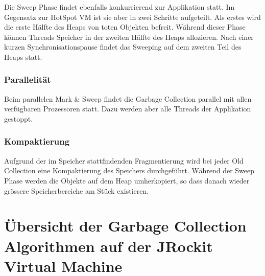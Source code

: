 Die Sweep Phase findet ebenfalls konkurrierend zur Applikation statt. Im Gegensatz zur HotSpot VM ist sie aber in zwei Schritte aufgeteilt. Als erstes wird die erste Hälfte des Heaps von toten Objekten befreit. Während dieser Phase können Threads Speicher in der zweiten Hälfte des Heaps allozieren. Nach einer kurzen Synchronisationspause findet das Sweeping auf dem zweiten Teil des Heaps statt.

\subsubsection{Parallelität}
Beim parallelen Mark \& Sweep findet die Garbage Collection parallel mit allen verfügbaren Prozessoren statt. Dazu werden aber alle Threads der Applikation gestoppt.

\subsubsection{Kompaktierung}
Aufgrund der im Speicher stattfindenden Fragmentierung wird bei jeder Old Collection eine Kompaktierung des Speichers durchgeführt. Während der Sweep Phase werden die Objekte auf dem Heap umherkopiert, so dass danach wieder grössere Speicherbereiche am Stück existieren.


\section{Übersicht der Garbage Collection Algorithmen auf der JRockit Virtual Machine}
